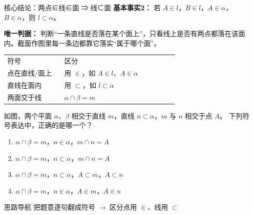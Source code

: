 \documentclass{exam-zh}
\begin{document}
\begin{eduSolutionBox}{核心结论：两点∈线∈面 ⇒ 线⊂面}
  \begingroup
  \setlength{\parskip}{2.5mm}
\textbf{基本事实2：} 若 $A\in l$，$B\in l$，$A\in\alpha$，$B\in\alpha$，则 $l\subset\alpha$。\par
\textbf{唯一判据：} 判断“一条直线是否落在某个面上”，只看线上是否有两点都落在该面内。截面作图里每一条边都靠它落实“属于哪个面”。\par
\begin{tabular}{p{0.30\linewidth}p{0.60\linewidth}}
符号 & 区分\\
点在直线/面上 & 用 $\in$，如 $A\in l$、$A\in\alpha$\\
直线在面内 & 用 $\subset$，如 $l\subset\alpha$\\
两面交于线 & $\alpha\cap\beta=m$\\
\end{tabular}
\par
  \endgroup
\end{eduSolutionBox}




\begin{eduProblemBlock}[例题 1]
\noindent
\begin{minipage}[t]{\dimexpr\linewidth-70mm-6mm\relax}
\vspace{0pt}
如图，两个平面 $\alpha$、$\beta$ 相交于直线 $m$，直线 $n\subset\alpha$，$m$ 与 $n$ 相交于点 $A$。
下列符号表达中，正确的是哪一个？
\begin{enumerate}[label=(\Alph*)]
\item $\alpha\cap\beta=m$，$n\in\alpha$，$m\cap n=A$
\item $\alpha\cap\beta=m$，$n\subset\alpha$，$m\cap n=A$
\item $\alpha\cap\beta=m$，$n\subset\alpha$，$A\subset m$，$A\subset n$
\item $\alpha\cap\beta=m$，$n\in\alpha$，$A\in m$，$A\in n$
\end{enumerate}
\end{minipage}\hfill
\begin{diagramcoltikz}{70mm}{看清两面的交线 $m$ 与直线 $n$。}
}
\end{diagramcoltikz}
\end{eduProblemBlock}





\begin{eduAuxItem}{思路导航}
把题意逐句翻成符号$\;\to\;$区分点用 $\in$、线用 $\subset$\end{eduAuxItem}
\end{document}

